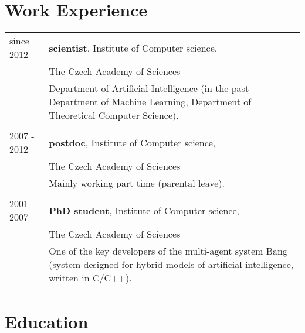 \documentclass[a4paper, oneside, final]{scrartcl} %
\newcommand{\gray}{\rowcolor[gray]{.90}} %
\begin{document}
\section{Work Experience}

\begin{tabularx}{0.97\linewidth}{>{\raggedright}p{2cm}X}
  \gray since 2012 & \textbf{scientist},   Institute of Computer science, \\
  \gray & \hspace{1.6cm} The Czech Academy of Sciences \\
  & Department of Artificial Intelligence (in the past Department of Machine Learning, Department of Theoretical Computer Science).\\
  & \\
  \gray 2007 - 2012 & \textbf{postdoc}, Institute of Computer science, \\
  \gray & \hspace{1.5cm} The Czech Academy of Sciences \\
  & Mainly working part time (parental leave).\\
  &\\
  \gray 2001 - 2007 & \textbf{PhD student},   Institute of Computer science, \\
  \gray & \hspace{2.5cm} The Czech Academy of Sciences \\
  &  One of the key developers of the multi-agent system Bang (system designed for hybrid models of artificial intelligence, written in C/C++). \\
\end{tabularx}

\vspace{12pt}


\section{Education}
\end{document}
